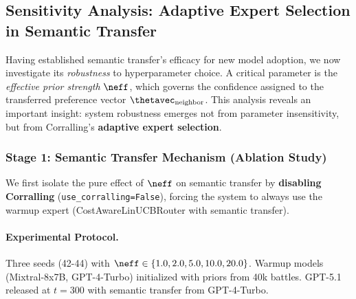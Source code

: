 
\subsection{Sensitivity Analysis: Adaptive Expert Selection in Semantic Transfer}
\label{sec:sensitivity_analysis}

Having established semantic transfer's efficacy for new model adoption, we now investigate its \textit{robustness} to hyperparameter choice. A critical parameter is the \textit{effective prior strength} $\neff$, which governs the confidence assigned to the transferred preference vector $\thetavec_{\text{neighbor}}$. This analysis reveals an important insight: system robustness emerges not from parameter insensitivity, but from Corralling's \textbf{adaptive expert selection}.


\subsubsection{Stage 1: Semantic Transfer Mechanism (Ablation Study)}

We first isolate the pure effect of $\neff$ on semantic transfer by \textbf{disabling Corralling} (\texttt{use\_corralling=False}), forcing the system to always use the warmup expert (CostAwareLinUCBRouter with semantic transfer).

\paragraph{Experimental Protocol.}
Three seeds (42-44) with $\neff \in \{1.0, 2.0, 5.0, 10.0, 20.0\}$. Warmup models (Mixtral-8x7B, GPT-4-Turbo) initialized with priors from 40k battles. GPT-5.1 released at $t=300$ with semantic transfer from GPT-4-Turbo.

